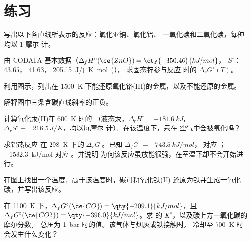 \section{练习}

\begin{exercise}[$\star$]\label{exo:b2:ellingham:1}
写出以下各直线所表示的反应：氧化亚铜、氧化铝、
一氧化碳和二氧化碳，每种均以 1 摩尔  计。
\end{exercise}

\begin{exercise}[$\star$]\label{exo:b2:ellingham:2}
由 CODATA 基本数据（$\Delta_f H^\circ(\ce{ZnO}) = \qty{-350.46}{kJ/mol}$，
$S^\circ$： 43.65， 41.63， \qty{205.15}{J/(K.mol)}），
求固态锌参与反应  时的 $\Delta_r G^\circ(T)$。
\end{exercise}

\begin{exercise}[$\star$]\label{exo:b2:ellingham:3}
利用图示，列出在
\qty{1500}{K} 下能还原氧化铬(III)的金属，以及不能还原的金属。
\end{exercise}

\begin{exercise}[$\star$]\label{exo:b2:ellingham:4}
解释图中三条含碳直线斜率的正负。
\end{exercise}

\begin{exercise}[$\star\star$]\label{exo:b2:ellingham:5}
计算氧化汞(II)在 \qty{600}{K} 时的
（液态汞，$\Delta_r H^\circ = \qty{-181.6}{kJ}$，$\Delta_r S^\circ =
\qty{-216.5}{J/K}$，均以每摩尔  计）。在该温度下，汞在
空气中会被氧化吗？
\end{exercise}

\begin{exercise}[$\star\star$]\label{exo:b2:ellingham:6}
求铝热反应  在 \qty{298}{K} 下的 $\Delta_r G^\circ$。已知 $\Delta_f G^\circ = \qty{-743.5}{kJ/mol}$，
对应 ；\qty{-1582.3}{kJ/mol} 对应 。并说明
为何该反应虽放能很强，在室温下却不会开始进行。
\end{exercise}

\begin{exercise}[$\star\star$]\label{exo:b2:ellingham:7}
在图上找出一个温度，高于该温度时，碳可将氧化铁(II)
还原为铁并生成一氧化碳，并写出该反应。
\end{exercise}

\begin{exercise}[$\star\star$]\label{exo:b2:ellingham:8}
在 \qty{1100}{K} 下，$\Delta_f G^\circ(\ce{CO}) = \qty{-209.1}{kJ/mol}$，且
$\Delta_f G^\circ(\ce{CO2}) = \qty{-396.0}{kJ/mol}$。求
的 $K^\circ$，以及碳上方一氧化碳的摩尔分数，
总压为 \qty{1}{bar} 时的值。该气体与烟灰或铁接触时，
冷却至 \qty{700}{K} 时会发生什么变化？
\end{exercise}

